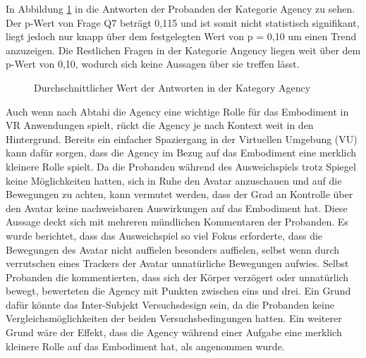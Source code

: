 In Abbildung \ref{fig:AgencyScores} in die Antworten der Probanden der Kategorie Agency zu sehen. Der p-Wert von Frage Q7 beträgt 0,115 und ist somit nicht statistisch signifikant, liegt jedoch nur knapp über dem festgelegten Wert von p = 0,10 um einen Trend anzuzeigen. Die Restlichen Fragen in der Kategorie Angency liegen weit über dem p-Wert von 0,10, wodurch sich keine Aussagen über sie treffen lässt.

\begin{figure}[h]
  \caption[Durchschnittlicher Wert der Antworten in der Kategory Agency]{Durchschnittlicher Wert der Antworten in der Kategory Agency}
  \label{fig:AgencyScores}
\end{figure}


Auch wenn nach Abtahi \cite{Abtahi2019} die Agency eine wichtige Rolle für das Embodiment in VR Anwendungen spielt, rückt die Agency je nach Kontext weit in den Hintergrund. Bereits ein einfacher Spaziergang in der Virtuellen Umgebung (VU) kann dafür sorgen, dass die Agency im Bezug auf das Embodiment eine merklich kleinere Rolle spielt. Da die Probanden während des Ausweichspiels trotz Spiegel keine Möglichkeiten hatten, sich in Ruhe den Avatar anzuschauen und auf die Bewegungen zu achten, kann vermutet werden, dass der Grad an Kontrolle über den Avatar keine nachweisbaren Auswirkungen auf das Embodiment hat. Diese Aussage deckt sich mit mehreren mündlichen Kommentaren der Probanden. Es wurde berichtet, dass das Ausweichspiel so viel Fokus erforderte, dass die Bewegungen des Avatar nicht auffielen besonders auffielen, selbst wenn durch verrutschen eines Trackers der Avatar unnatürliche Bewegungen aufwies.
Selbst Probanden die kommentierten, dass sich der Körper verzögert oder unnatürlich bewegt, bewerteten die Agency mit Punkten zwischen eins und drei. Ein Grund dafür könnte das Inter-Subjekt Versuchsdesign sein, da die Probanden keine Vergleichsmöglichkeiten der beiden Versuchsbedingungen hatten. Ein weiterer Grund wäre der Effekt, dass die Agency während einer Aufgabe eine merklich kleinere Rolle auf das Embodiment hat, als angenommen wurde.

